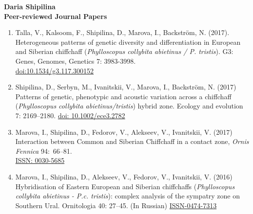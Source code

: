 \documentclass[10pt]{article}
\date{}
\begin{document}


\newlength{\oldcvlabelwidth}
\renewcommand*{\cvbibname}{}




\begin{cv}%





\newpage
{\large \bf Daria Shipilina}\\

\textbf{\quad Peer-reviewed Journal Papers}

	\begin{enumerate}%
	  \setlength\itemsep{0.2em}
	\item Talla, V., Kalsoom, F., Shipilina, D., Marova, I., Backström, N. (2017). \\
	Heterogeneous patterns of genetic diversity and differentiation in European and Siberian chiffchaff (\textit{Phylloscopus collybita abietinus / P. tristis}). G3: Genes, Genomes, Genetics 7: 3983-3998. \\
\href{http://dx.doi.org/doi:10.1534/g3.117.300152}{doi:10.1534/g3.117.300152}
	 \item  Shipilina, D., Serbyn, M., Ivanitskii, V., Marova, I., Backström, N. (2017)\\
	        Patterns of genetic, phenotypic and acoustic variation across a chiffchaff (\textit{Phylloscopus collybita abietinus/tristis}) hybrid zone. Ecology and evolution 7: 2169--2180.
	         \href{http://dx.doi.org/doi: 10.1002/ece3.2782}{doi: 10.1002/ece3.2782}       
	 \item  Marova, I., Shipilina, D., Fedorov, V., Alekseev, V., Ivanitskii, V. (2017)\\
	         Interaction between Common and Siberian Chiffchaff in a contact zone,  \textit{Ornis Fennica} 94:~66--81.\\
	         \href{https://www.ornisfennica.org/pdf/latest/172Marova.pdf}{ISSN: 0030-5685} 
		\item Marova, I., Shipilina, D., Alekseev, V., Fedorov, V., Ivanitskii, V. (2016)\\
		Hybridisation of Eastern European and Siberian chiffchaffs (\textit{Phylloscopus collybita abietinus - P.c. tristis}): complex analysis of the sympatry zone on Southern Ural. Ornitologia 40: 27--45. (In Russian) 
\href{http://zmmu.msu.ru/ornithology/Vol\%2040/27-47\%20Marova\%20et\%20al.pdf}{ISSN-0474-7313} 
	


\end{enumerate}
\end{cv}
\end{document}
